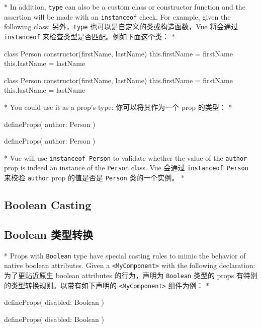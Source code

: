 \begin{paracol}{2}
\switchcolumn[0]*%
In addition, \texttt{type} can also be a custom class or constructor
function and the assertion will be made with an \texttt{instanceof}
check. For example, given the following class:
\switchcolumn
另外，\texttt{type} 也可以是自定义的类或构造函数，Vue 将会通过
\texttt{instanceof} 来检查类型是否匹配。例如下面这个类：
\switchcolumn[0]*%
\begin{codeJs}
class Person {
  constructor(firstName, lastName) {
    this.firstName = firstName
    this.lastName = lastName
  }
}
\end{codeJs}
\switchcolumn
\begin{codeJs}
class Person {
  constructor(firstName, lastName) {
    this.firstName = firstName
    this.lastName = lastName
  }
}
\end{codeJs}
\switchcolumn[0]*%
You could use it as a prop's type:
\switchcolumn
你可以将其作为一个 prop 的类型：
\switchcolumn[0]*%
\begin{codeJs}
defineProps({
  author: Person
})
\end{codeJs}
\switchcolumn
\begin{codeJs}
defineProps({
  author: Person
})
\end{codeJs}


\switchcolumn[0]*%
Vue will use \texttt{instanceof\ Person} to validate whether the value
of the \texttt{author} prop is indeed an instance of the \texttt{Person}
class.
\switchcolumn
Vue 会通过 \texttt{instanceof\ Person} 来校验 \texttt{author} prop
的值是否是 \texttt{Person} 类的一个实例。
\switchcolumn[0]*%
\subsection{Boolean Casting}
\switchcolumn
\subsection{Boolean 类型转换}


\switchcolumn[0]*%
Props with \texttt{Boolean} type have special casting rules to mimic the
behavior of native boolean attributes. Given a
\texttt{\textless{}MyComponent\textgreater{}} with the following
declaration:
\switchcolumn
为了更贴近原生 boolean attributes 的行为，声明为 \texttt{Boolean} 类型的
props 有特别的类型转换规则。以带有如下声明的
\texttt{\textless{}MyComponent\textgreater{}} 组件为例：
\switchcolumn[0]*%
\begin{codeJs}
defineProps({
  disabled: Boolean
})
\end{codeJs}
\switchcolumn
\begin{codeJs}
defineProps({
  disabled: Boolean
})
\end{codeJs}



\end{paracol}
